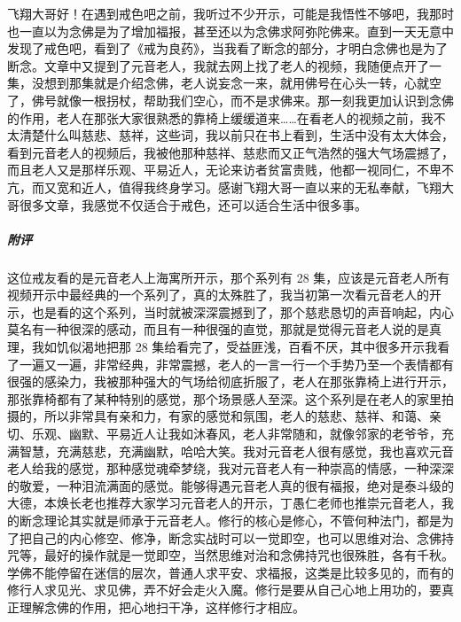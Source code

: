 \begin{case}
    飞翔大哥好！在遇到戒色吧之前，我听过不少开示，可能是我悟性不够吧，我那时也一直以为念佛是为了增加福报，甚至还以为念佛求阿弥陀佛来。直到一天无意中发现了戒色吧，看到了《戒为良药》，当我看了断念的部分，才明白念佛也是为了断念。文章中又提到了元音老人，我就去网上找了老人的视频，我随便点开了一集，没想到那集就是介绍念佛，老人说妄念一来，就用佛号在心头一转，心就空了，佛号就像一根拐杖，帮助我们空心，而不是求佛来。那一刻我更加认识到念佛的作用，老人在那张大家很熟悉的靠椅上缓缓道来……在看老人的视频之前，我不太清楚什么叫慈悲、慈祥，这些词，我以前只在书上看到，生活中没有太大体会，看到元音老人的视频后，我被他那种慈祥、慈悲而又正气浩然的强大气场震撼了，而且老人又是那样乐观、平易近人，无论来访者贫富贵贱，他都一视同仁，不卑不亢，而又宽和近人，值得我终身学习。感谢飞翔大哥一直以来的无私奉献，飞翔大哥很多文章，我感觉不仅适合于戒色，还可以适合生活中很多事。
    \subparagraph{附评} 这位戒友看的是元音老人上海寓所开示，那个系列有 28 集，应该是元音老人所有视频开示中最经典的一个系列了，真的太殊胜了，我当初第一次看元音老人的开示，也是看的这个系列，当时就被深深震撼到了，那个慈悲恳切的声音响起，内心莫名有一种很深的感动，而且有一种很强的直觉，那就是觉得元音老人说的是真理，我如饥似渴地把那 28 集给看完了，受益匪浅，百看不厌，其中很多开示我看了一遍又一遍，非常经典，非常震撼，老人的一言一行一个手势乃至一个表情都有很强的感染力，我被那种强大的气场给彻底折服了，老人在那张靠椅上进行开示，那张靠椅都有了某种特别的感觉，那个场景感人至深。这个系列是在老人的家里拍摄的，所以非常具有亲和力，有家的感觉和氛围，老人的慈悲、慈祥、和蔼、亲切、乐观、幽默、平易近人让我如沐春风，老人非常随和，就像邻家的老爷爷，充满智慧，充满慈悲，充满幽默，哈哈大笑。我对元音老人很有感觉，我也喜欢元音老人给我的感觉，那种感觉魂牵梦绕，我对元音老人有一种崇高的情感，一种深深的敬爱，一种泪流满面的感觉。能够得遇元音老人真的很有福报，绝对是泰斗级的大德，本焕长老也推荐大家学习元音老人的开示，丁愚仁老师也推崇元音老人，我的断念理论其实就是师承于元音老人。修行的核心是修心，不管何种法门，都是为了把自己的内心修空、修净，断念实战时可以一觉即空，也可以思维对治、念佛持咒等，最好的操作就是一觉即空，当然思维对治和念佛持咒也很殊胜，各有千秋。学佛不能停留在迷信的层次，普通人求平安、求福报，这类是比较多见的，而有的修行人求见光、求见佛，弄不好会走火入魔。修行是要从自己心地上用功的，要真正理解念佛的作用，把心地扫干净，这样修行才相应。
\end{case}

